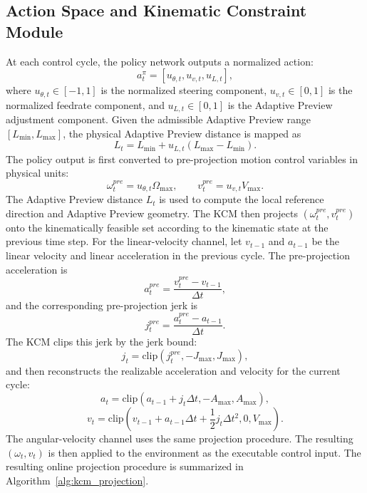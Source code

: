 \documentclass[preprint,12pt]{elsarticle}
\begin{document}
\subsection{Action Space and Kinematic Constraint Module}
At each control cycle, the policy network outputs a normalized action:
\begin{equation}
a_t^{\pi}=[u_{\theta,t},u_{v,t},u_{L,t}],
\end{equation}
where $u_{\theta,t}\in[-1,1]$ is the normalized steering component, $u_{v,t}\in[0,1]$ is the normalized feedrate component, and $u_{L,t}\in[0,1]$ is the Adaptive Preview adjustment component. Given the admissible Adaptive Preview range $[L_{\min},L_{\max}]$, the physical Adaptive Preview distance is mapped as
\begin{equation}
L_t=L_{\min}+u_{L,t}(L_{\max}-L_{\min}).
\end{equation}
The policy output is first converted to pre-projection motion control variables in physical units:
\begin{equation}
\omega_t^{pre}=u_{\theta,t}\Omega_{\max},\qquad v_t^{pre}=u_{v,t}V_{\max}.
\end{equation}
The Adaptive Preview distance $L_t$ is used to compute the local reference direction and Adaptive Preview geometry. The KCM then projects $(\omega_t^{pre},v_t^{pre})$ onto the kinematically feasible set according to the kinematic state at the previous time step. For the linear-velocity channel, let $v_{t-1}$ and $a_{t-1}$ be the linear velocity and linear acceleration in the previous cycle. The pre-projection acceleration is
\begin{equation}
a_t^{pre}=\frac{v_t^{pre}-v_{t-1}}{\Delta t},
\end{equation}
and the corresponding pre-projection jerk is
\begin{equation}
j_t^{pre}=\frac{a_t^{pre}-a_{t-1}}{\Delta t}.
\end{equation}
The KCM clips this jerk by the jerk bound:
\begin{equation}
j_t=\mathrm{clip}(j_t^{pre},-J_{\max},J_{\max}),
\end{equation}
and then reconstructs the realizable acceleration and velocity for the current cycle:
\begin{equation}
a_t=\mathrm{clip}(a_{t-1}+j_t\Delta t,-A_{\max},A_{\max}),
\end{equation}
\begin{equation}
v_t=\mathrm{clip}\left(v_{t-1}+a_{t-1}\Delta t+\frac{1}{2}j_t\Delta t^2,0,V_{\max}\right).
\end{equation}
The angular-velocity channel uses the same projection procedure. The resulting $(\omega_t,v_t)$ is then applied to the environment as the executable control input. The resulting online projection procedure is summarized in Algorithm~\ref{alg:kcm_projection}.
\end{document}
